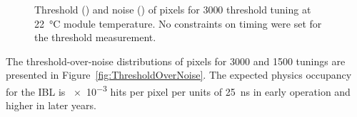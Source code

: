 \begin{figure}
        \centering
        \caption{Threshold () and noise () of pixels for \SI{3000}{\e} threshold tuning at \SI{22}{\celsius} module temperature. No constraints on timing were set for the threshold measurement.}
         \label{fig:ThresholdPerPixel}
\end{figure}


The threshold-over-noise distributions of pixels for \SI{3000}{\e} and \SI{1500}{\e} tunings are presented in Figure~\ref{fig:ThresholdOverNoise}. 
The expected physics occupancy for the IBL is \num{e-3} hits per pixel per units of \SI{25}{\nano\second} in early operation and higher in later years. 

